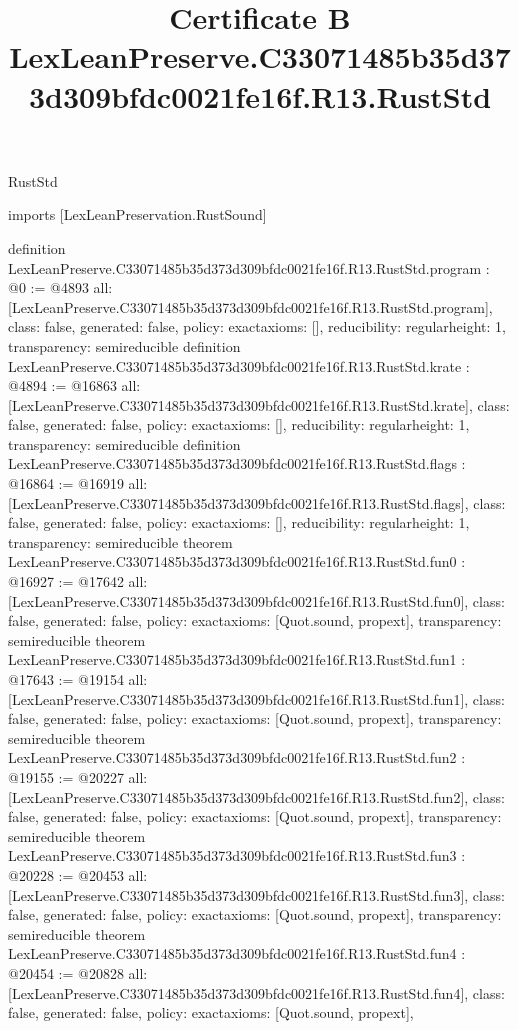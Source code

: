 \begin{lexlean}{RustStd}
\title{Certificate B LexLeanPreserve.C33071485b35d373d309bfdc0021fe16f.R13.RustStd}
\begin{coremodule}
imports [LexLeanPreservation.RustSound]

definition LexLeanPreserve.C33071485b35d373d309bfdc0021fe16f.R13.RustStd.program : @0 := @4893 {
  all: [LexLeanPreserve.C33071485b35d373d309bfdc0021fe16f.R13.RustStd.program],
  class: false,
  generated: false,
  policy: exact{axioms: []},
  reducibility: regular{height: 1},
  transparency: semireducible
}
definition LexLeanPreserve.C33071485b35d373d309bfdc0021fe16f.R13.RustStd.krate : @4894 := @16863 {
  all: [LexLeanPreserve.C33071485b35d373d309bfdc0021fe16f.R13.RustStd.krate],
  class: false,
  generated: false,
  policy: exact{axioms: []},
  reducibility: regular{height: 1},
  transparency: semireducible
}
definition LexLeanPreserve.C33071485b35d373d309bfdc0021fe16f.R13.RustStd.flags : @16864 := @16919 {
  all: [LexLeanPreserve.C33071485b35d373d309bfdc0021fe16f.R13.RustStd.flags],
  class: false,
  generated: false,
  policy: exact{axioms: []},
  reducibility: regular{height: 1},
  transparency: semireducible
}
theorem LexLeanPreserve.C33071485b35d373d309bfdc0021fe16f.R13.RustStd.fun0 : @16927 := @17642 {
  all: [LexLeanPreserve.C33071485b35d373d309bfdc0021fe16f.R13.RustStd.fun0],
  class: false,
  generated: false,
  policy: exact{axioms: [Quot.sound, propext]},
  transparency: semireducible
}
theorem LexLeanPreserve.C33071485b35d373d309bfdc0021fe16f.R13.RustStd.fun1 : @17643 := @19154 {
  all: [LexLeanPreserve.C33071485b35d373d309bfdc0021fe16f.R13.RustStd.fun1],
  class: false,
  generated: false,
  policy: exact{axioms: [Quot.sound, propext]},
  transparency: semireducible
}
theorem LexLeanPreserve.C33071485b35d373d309bfdc0021fe16f.R13.RustStd.fun2 : @19155 := @20227 {
  all: [LexLeanPreserve.C33071485b35d373d309bfdc0021fe16f.R13.RustStd.fun2],
  class: false,
  generated: false,
  policy: exact{axioms: [Quot.sound, propext]},
  transparency: semireducible
}
theorem LexLeanPreserve.C33071485b35d373d309bfdc0021fe16f.R13.RustStd.fun3 : @20228 := @20453 {
  all: [LexLeanPreserve.C33071485b35d373d309bfdc0021fe16f.R13.RustStd.fun3],
  class: false,
  generated: false,
  policy: exact{axioms: [Quot.sound, propext]},
  transparency: semireducible
}
theorem LexLeanPreserve.C33071485b35d373d309bfdc0021fe16f.R13.RustStd.fun4 : @20454 := @20828 {
  all: [LexLeanPreserve.C33071485b35d373d309bfdc0021fe16f.R13.RustStd.fun4],
  class: false,
  generated: false,
  policy: exact{axioms: [Quot.sound, propext]},
}
\end{coremodule}
\end{lexlean}
